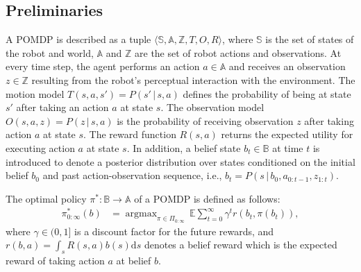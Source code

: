 \documentclass[letterpaper]{article} %
\newcommand{\phdone}[1]{} %
\newcommand{\argmax}{\mathop{\mathrm{argmax}}}
\begin{document}
\subsection{Preliminaries}
\phdone{POMDP Elements}
A POMDP is described as a tuple $\langle \mathbb{S}, \mathbb{A}, \mathbb{Z}, T, O, R \rangle$, where $\mathbb{S}$ is the set of states of the robot and world, $\mathbb{A}$ and $\mathbb{Z}$ are the set of robot actions and observations.
At every time step, the agent performs an action $a \in \mathbb{A}$ and receives an observation $z \in \mathbb{Z}$ resulting from the robot's perceptual interaction with the environment.
The motion model $T(s, a, s') = P(s'\,|\,s, a)$ defines the probability of being at state $s'$ after taking an action $a$ at state $s$.
The observation model $O(s, a, z) = P(z\,|\,s, a)$ is the probability of receiving observation $z$ after taking action $a$ at state $s$.
The reward function $R(s, a)$ returns the expected utility for executing action $a$ at state $s$.
In addition, a belief state $b_t \in \mathbb{B}$ at time $t$ is introduced to denote a posterior distribution over states conditioned on the initial belief $b_0$ and past action-observation sequence, i.e., $b_{t} = P(s \,|\, b_0, a_{0:t-1}, z_{1:t})$.

\phdone{POMDP Objective function}
The optimal policy $\pi^* \! : \mathbb{B} \to \mathbb{A}$ of a POMDP is defined as follows:
\begin{align}
  \pi_{0:\infty}^*(b) &= \argmax_{\pi \in \Pi_{0:\infty}} \, \mathbb{E} \sum_{t=0}^{\infty} \gamma^t r(b_t, \pi(b_t)),
  \label{eq:objective_function}
\end{align}
where $\gamma \in (0, 1]$ is a discount factor for the future rewards, and $r(b,a)=\int_s R(s,a)b(s)\mathrm{d}s$ denotes a belief reward which is the expected reward of taking action $a$ at belief $b$.


\end{document}
